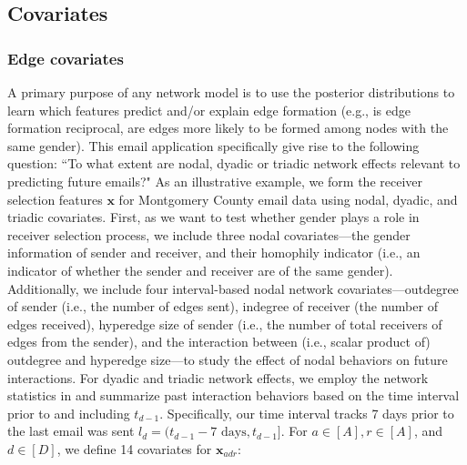 \documentclass[ba]{imsart}
\numberwithin{equation}{section}
\theoremstyle{plain}
\begin{document}
	\subsection{Covariates}\label{subsec:Covariates_email}
	\subsubsection{Edge covariates}
	A primary purpose of any network model is to use the posterior distributions to learn which features predict and/or explain edge formation (e.g., is edge formation reciprocal, are edges more likely to be formed among nodes with the same gender). This email application specifically give rise to the following question: ``To what extent are nodal, dyadic or triadic network effects relevant to predicting future emails?" As an illustrative example, we form the receiver selection features $\boldsymbol{x}$ for Montgomery County email data using nodal, dyadic, and triadic covariates. First, as we want to test whether gender plays a role in receiver selection process, we include three nodal covariates---the gender information of sender and receiver, and their homophily indicator (i.e., an indicator of whether the sender and receiver are of the same gender).  Additionally, we include four interval-based nodal network covariates---outdegree of sender (i.e., the number of edges sent), indegree of receiver (the number of edges received), hyperedge size of sender (i.e., the number of total receivers of edges from the sender), and the interaction between (i.e., scalar product of) outdegree and hyperedge size---to study the effect of nodal behaviors on future interactions. For dyadic and triadic network effects, we employ the network statistics in \cite{PerryWolfe2012} and summarize past interaction behaviors based on the time interval prior to and including $t_{d-1}$. Specifically, our time interval tracks 7 days prior to the last email was sent $l_d = (t_{d-1}-7\mbox{ days}, t_{d-1}]$. For $a \in [A], r \in [A]$, and $d \in [D]$, we define 14 covariates for $\boldsymbol{x}_{adr}$:
\end{document}
